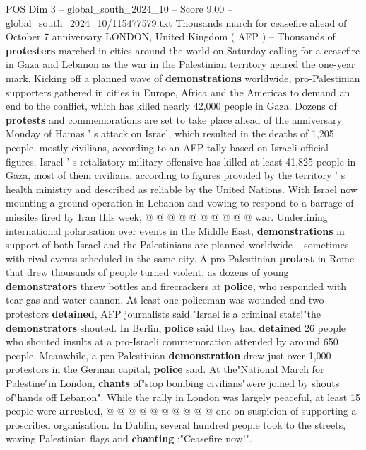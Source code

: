 \begin{textsample}{POS Dim 3 – global\_south\_2024\_10 – Score 9.00 – global\_south\_2024\_10/115477579.txt}  \label{ex:f3_pos_403}
Thousands march for ceasefire ahead of October 7 anniversary LONDON, United Kingdom ( AFP ) -- Thousands of \textbf{protesters} marched in cities around the world on Saturday calling for a ceasefire in Gaza and Lebanon as the war in the Palestinian territory neared the one-year mark.
Kicking off a planned wave of \textbf{demonstrations} worldwide, pro-Palestinian supporters gathered in cities in Europe, Africa and the Americas to demand an end to the conflict, which has killed nearly 42,000 people in Gaza.
Dozens of \textbf{protests} and commemorations are set to take place ahead of the anniversary Monday of Hamas ' s attack on Israel, which resulted in the deaths of 1,205 people, mostly civilians, according to an AFP tally based on Israeli official figures.
Israel ' s retaliatory military offensive has killed at least 41,825 people in Gaza, most of them civilians, according to figures provided by the territory ' s health ministry and described as reliable by the United Nations.
With Israel now mounting a ground operation in Lebanon and vowing to respond to a barrage of missiles fired by Iran this week, @ @ @ @ @ @ @ @ @ @ war.
Underlining international polarisation over events in the Middle East, \textbf{demonstrations} in support of both Israel and the Palestinians are planned worldwide -- sometimes with rival events scheduled in the same city.
A pro-Palestinian \textbf{protest} in Rome that drew thousands of people turned violent, as dozens of young \textbf{demonstrators} threw bottles and firecrackers at \textbf{police}, who responded with tear gas and water cannon.
At least one policeman was wounded and two protestors \textbf{detained}, AFP journalists said."Israel is a criminal state!"the \textbf{demonstrators} shouted.
In Berlin, \textbf{police} said they had \textbf{detained} 26 people who shouted insults at a pro-Israeli commemoration attended by around 650 people.
Meanwhile, a pro-Palestinian \textbf{demonstration} drew just over 1,000 protestors in the German capital, \textbf{police} said.
At the"National March for Palestine"in London, \textbf{chants} of"stop bombing civilians"were joined by shouts of"hands off Lebanon".
While the rally in London was largely peaceful, at least 15 people were \textbf{arrested}, @ @ @ @ @ @ @ @ @ @ one on suspicion of supporting a proscribed organisation.
In Dublin, several hundred people took to the streets, waving Palestinian flags and \textbf{chanting} :"Ceasefire now!".

\end{textsample}
